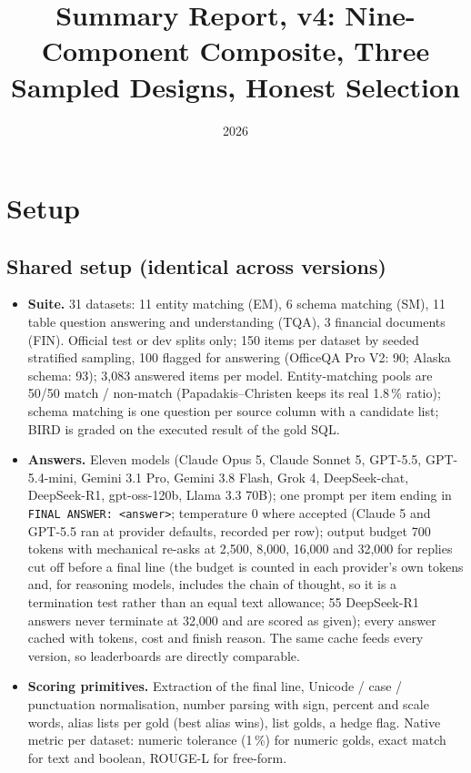 \documentclass[11pt]{article}
\title{Summary Report, v4: Nine-Component Composite, Three Sampled Designs, Honest Selection}
\author{}
\date{2026}
\begin{document}
\maketitle

\section{Setup}

\subsection{Shared setup (identical across versions)}
\begin{itemize}
\item \textbf{Suite.} 31 datasets: 11 entity matching (EM), 6 schema matching (SM), 11 table question answering and understanding (TQA), 3 financial documents (FIN). Official test or dev splits only; 150 items per dataset by seeded stratified sampling, 100 flagged for answering (OfficeQA Pro V2: 90; Alaska schema: 93); 3,083 answered items per model. Entity-matching pools are 50/50 match / non-match (Papadakis--Christen keeps its real 1.8\,\% ratio); schema matching is one question per source column with a candidate list; BIRD is graded on the executed result of the gold SQL.
\item \textbf{Answers.} Eleven models (Claude Opus 5, Claude Sonnet 5, GPT-5.5, GPT-5.4-mini, Gemini 3.1 Pro, Gemini 3.8 Flash, Grok 4, DeepSeek-chat, DeepSeek-R1, gpt-oss-120b, Llama 3.3 70B); one prompt per item ending in \texttt{FINAL ANSWER: <answer>}; temperature 0 where accepted (Claude 5 and GPT-5.5 ran at provider defaults, recorded per row); output budget 700 tokens with mechanical re-asks at 2,500, 8,000, 16,000 and 32,000 for replies cut off before a final line (the budget is counted in each provider's own tokens and, for reasoning models, includes the chain of thought, so it is a termination test rather than an equal text allowance; 55 DeepSeek-R1 answers never terminate at 32,000 and are scored as given); every answer cached with tokens, cost and finish reason. The same cache feeds every version, so leaderboards are directly comparable.
\item \textbf{Scoring primitives.} Extraction of the final line, Unicode / case / punctuation normalisation, number parsing with sign, percent and scale words, alias lists per gold (best alias wins), list golds, a hedge flag. Native metric per dataset: numeric tolerance (1\,\%) for numeric golds, exact match for text and boolean, ROUGE-L for free-form.

\end{itemize}
\end{document}
